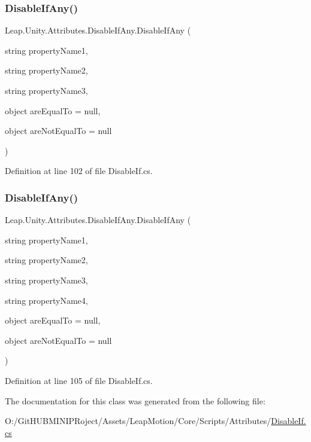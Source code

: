 \subsubsection{\texorpdfstring{DisableIfAny()}{DisableIfAny()}\hspace{0.1cm}{\footnotesize\ttfamily [2/3]}}
{\footnotesize\ttfamily Leap.\+Unity.\+Attributes.\+Disable\+If\+Any.\+Disable\+If\+Any (\begin{DoxyParamCaption}\item[{string}]{property\+Name1,  }\item[{string}]{property\+Name2,  }\item[{string}]{property\+Name3,  }\item[{object}]{are\+Equal\+To = {\ttfamily null},  }\item[{object}]{are\+Not\+Equal\+To = {\ttfamily null} }\end{DoxyParamCaption})}



Definition at line 102 of file Disable\+If.\+cs.

\mbox{\label{class_leap_1_1_unity_1_1_attributes_1_1_disable_if_any_a7f5b83e25ef1268d183ffad009c62e9e}} 
\subsubsection{\texorpdfstring{DisableIfAny()}{DisableIfAny()}\hspace{0.1cm}{\footnotesize\ttfamily [3/3]}}
{\footnotesize\ttfamily Leap.\+Unity.\+Attributes.\+Disable\+If\+Any.\+Disable\+If\+Any (\begin{DoxyParamCaption}\item[{string}]{property\+Name1,  }\item[{string}]{property\+Name2,  }\item[{string}]{property\+Name3,  }\item[{string}]{property\+Name4,  }\item[{object}]{are\+Equal\+To = {\ttfamily null},  }\item[{object}]{are\+Not\+Equal\+To = {\ttfamily null} }\end{DoxyParamCaption})}



Definition at line 105 of file Disable\+If.\+cs.



The documentation for this class was generated from the following file\+:\begin{DoxyCompactItemize}
\item 
O\+:/\+Git\+H\+U\+B\+M\+I\+N\+I\+P\+Roject/\+Assets/\+Leap\+Motion/\+Core/\+Scripts/\+Attributes/\mbox{\hyperlink{_disable_if_8cs}{Disable\+If.\+cs}}\end{DoxyCompactItemize}
